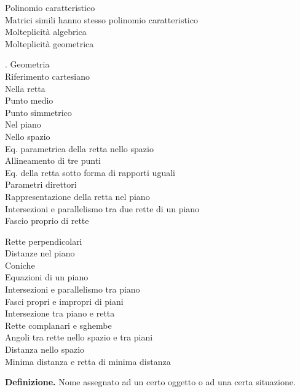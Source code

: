 \documentclass[11pt,a4paper]{article}
\newcommand{\pagina}[1]{\clearpage}
\begin{document}
\begin{flushleft}
\textbullet{}   Polinomio caratteristico\\
\textbullet{}   Matrici simili hanno stesso polinomio caratteristico\\
\textbullet{}   Molteplicità algebrica\\
\textbullet{}   Molteplicità geometrica\\
\par\smallskip
\par{}. Geometria\\
\textbullet{}   Riferimento cartesiano\\
\textbullet{}   Nella retta\\
\textbullet{}   Punto medio\\
\textbullet{}   Punto simmetrico\\
\textbullet{}   Nel piano\\
\textbullet{}   Nello spazio\\
\textbullet{}   Eq. parametrica della retta nello spazio\\
\textbullet{}   Allineamento di tre punti\\
\textbullet{}   Eq. della retta sotto forma di rapporti uguali\\
\textbullet{}   Parametri direttori\\
\textbullet{}   Rappresentazione della retta nel piano\\
\textbullet{}   Intersezioni e parallelismo tra due rette di un piano\\
\textbullet{}   Fascio proprio di rette\\
\end{flushleft}
\pagina{4}
\begin{flushleft}
\textbullet{}   Rette perpendicolari\\
\textbullet{}   Distanze nel piano\\
\textbullet{}   Coniche\\
\textbullet{}   Equazioni di un piano\\
\textbullet{}   Intersezioni e parallelismo tra piano\\
\textbullet{}   Fasci propri e impropri di piani\\
\textbullet{}   Intersezione tra piano e retta\\
\textbullet{}   Rette complanari e sghembe\\
\textbullet{}   Angoli tra rette nello spazio e tra piani\\
\textbullet{}   Distanza nello spazio\\
\textbullet{}   Minima distanza e retta di minima distanza\\
\end{flushleft}
\pagina{5}
\textbf{Definizione.} Nome assegnato ad un certo oggetto o ad una certa situazione.
\end{document}
